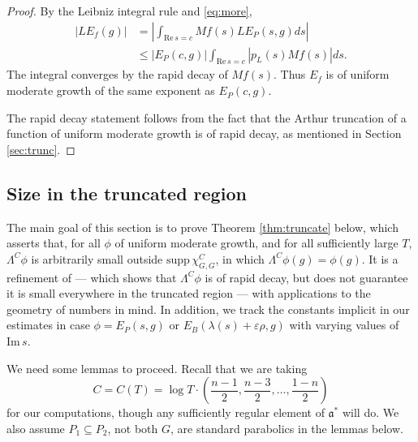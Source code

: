 \documentclass[11pt]{amsart}
\numberwithin{theorem}{section}
\numberwithin{equation}{section}
\theoremstyle{remark}
\theoremstyle{definition}
\newcommand{\re}{\mathrm{Re}\,}
\newcommand{\im}{\mathrm{Im}\,}
\newcommand{\ga}{\mathfrak{a}}
\begin{document}
\begin{proof}

By the Leibniz integral rule and \eqref{eq:more},
\begin{align*}
\left| LE_f(g) \right| &= \left| \int_{\re s=c} Mf(s) LE_P(s,g) ds \right| \\
&\leq |E_P(c,g)| \int_{\re s=c} \left|p_L(s)Mf(s)\right| ds.
\end{align*}
The integral converges by the rapid decay of $Mf(s)$. Thus $E_f$ is of uniform moderate growth of the same exponent as $E_P(c,g)$.

The rapid decay statement follows from the fact that the Arthur truncation of a function of uniform moderate growth is of rapid decay, as mentioned in Section \ref{sec:trunc}.
\end{proof}


\subsection{Size in the truncated region}

The main goal of this section is to prove Theorem \ref{thm:truncate} below, which asserts that, for all $\phi$ of uniform moderate growth, and for all sufficiently large $T$, $\Lambda^C \phi$ is arbitrarily small outside $\mathrm{supp}\,\chi_{G,G}^C$, in which $\Lambda^C \phi(g) = \phi(g)$. It is a refinement of \cite[Proposition 13.2]{Art05} --- which shows that $\Lambda^C \phi$ is of rapid decay, but does not guarantee it is small everywhere in the truncated region --- with applications to the geometry of numbers in mind. In addition, we track the constants implicit in our estimates in case $\phi = E_P(s,g)$ or $E_B(\lambda(s)+\varepsilon\rho,g)$ with varying values of $\im s$.

We need some lemmas to proceed. Recall that we are taking
\begin{equation*}
C = C(T) = \log T \cdot \left(\frac{n-1}{2},\frac{n-3}{2},\ldots,\frac{1-n}{2}\right)
\end{equation*}
for our computations, though any sufficiently regular element of $\ga^*$ will do. We also assume $P_1 \subseteq P_2$, not both $G$, are standard parabolics in the lemmas below.
\end{document}
